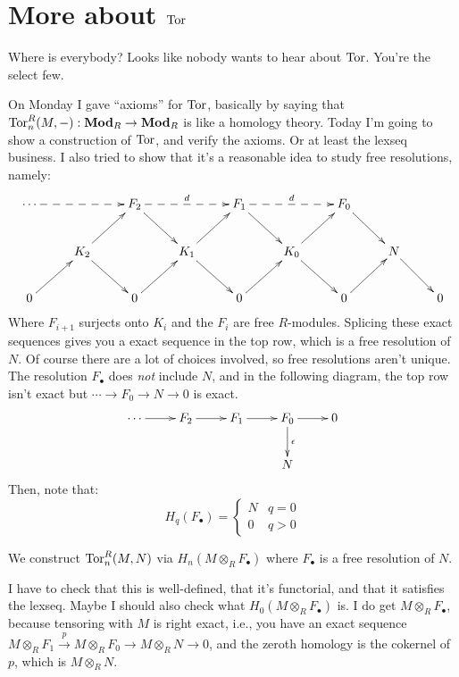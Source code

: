 \section{More about $\operatorname{Tor}$}
Where is everybody? Looks like nobody wants to hear about $\operatorname{Tor}$. You're the select few.

On Monday I gave ``axioms'' for $\operatorname{Tor}$, basically by saying that $\operatorname{Tor}^R_n(M,-):\mathbf{Mod}_R\to\mathbf{Mod}_R$ is like a homology theory. Today I'm going to show a construction of $\operatorname{Tor}$, and verify the axioms. Or at least the lexseq business. I also tried to show that it's a reasonable idea to study free resolutions, namely:
\begin{equation*}
\xymatrix{\cdots\ar@{-->}[rr] & & F_2\ar[dr]\ar@{-->}[rr]^d & & F_1\ar[dr]\ar@{-->}[rr]^d & & F_0\ar[dr]\\
& K_2\ar[ur]\ar[dr] & & K_1\ar[ur]\ar[dr] & & K_0\ar[ur]\ar[dr] & & N\ar[dr]\\
0\ar[ur] & & 0\ar[ur] & & 0\ar[ur] & & 0\ar[ur] & & 0}
\end{equation*}
Where $F_{i+1}$ surjects onto $K_i$ and the $F_i$ are free $R$-modules. Splicing these exact sequences gives you a exact sequence in the top row, which is a free resolution of $N$. Of course there are a lot of choices involved, so free resolutions aren't unique. The resolution $F_\bullet$ does \emph{not} include $N$, and in the following diagram, the top row isn't exact but $\cdots\to F_0\to N\to 0$ is exact.
\begin{equation*}
\xymatrix{\cdots\ar[r] & F_2\ar[r] & F_1\ar[r] & F_0\ar[r]\ar[d]^\epsilon & 0\\
 & & & N & }
\end{equation*}
Then, note that:
\begin{equation*}
 H_q(F_\bullet)=\begin{cases}
N & q=0\\
0 & q>0
\end{cases}
\end{equation*}
\begin{construction}
We construct $\operatorname{Tor}^R_n(M,N)$ via $ H_n(M\otimes_R F_\bullet)$ where $F_\bullet$ is a free resolution of $N$.
\end{construction}
I have to check that this is well-defined, that it's functorial, and that it satisfies the lexseq. Maybe I should also check what $ H_0(M\otimes_R F_\bullet)$ is. I do get $M\otimes_R F_\bullet$, because tensoring with $M$ is right exact, i.e., you have an exact sequence $M\otimes_R F_1\xrightarrow{p} M\otimes_R F_0\to M\otimes_R N\to 0$, and the zeroth homology is the cokernel of $p$, which is $M\otimes_R N$.

